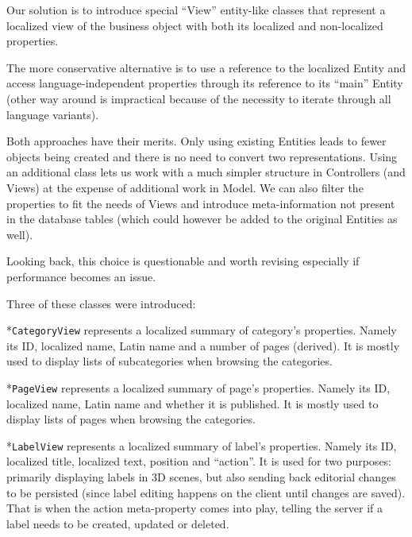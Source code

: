 Our solution is to introduce special “View” entity-like classes that represent a localized view of the business object with both its localized and non-localized properties.

The more conservative alternative is to use a reference to the localized Entity and access language-independent properties through its reference to its “main” Entity (other way around is impractical because of the necessity to iterate through all language variants).

Both approaches have their merits. Only using existing Entities leads to fewer objects being created and there is no need to convert two representations. Using an additional class lets us work with a much simpler structure in Controllers (and Views) at the expense of additional work in Model. We can also filter the properties to fit the needs of Views and introduce meta-information not present in the database tables (which could however be added to the original Entities as well).

Looking back, this choice is questionable and worth revising especially if performance becomes an issue.

Three of these classes were introduced:

\begitems

*{\tt CategoryView} represents a localized summary of category’s properties. Namely its ID, localized name, Latin name and a number of pages (derived). It is mostly used to display lists of subcategories when browsing the categories.

*{\tt PageView} represents a localized summary of page’s properties. Namely its ID, localized name, Latin name and whether it is published. It is mostly used to display lists of pages when browsing the categories.

*{\tt LabelView} represents a localized summary of label’s properties. Namely its ID, localized title, localized text, position and “action”. It is used for two purposes: primarily displaying labels in 3D scenes, but also sending back editorial changes to be persisted (since label editing happens on the client until changes are saved). That is when the action meta-property comes into play, telling the server if a label needs to be created, updated or deleted.

\enditems
